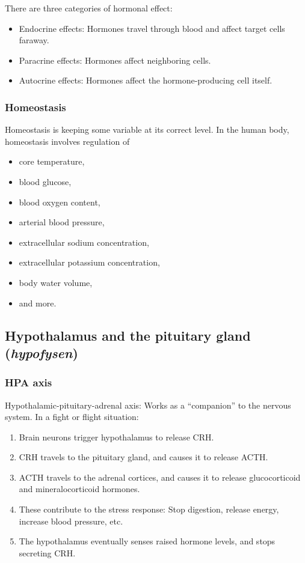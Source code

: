 There are three categories of hormonal effect:
\begin{itemize}
  \item Endocrine effects: Hormones travel through blood and affect target cells faraway.
  \item Paracrine effects: Hormones affect neighboring cells.
  \item Autocrine effects: Hormones affect the hormone-producing cell itself.
\end{itemize}

\subsubsection{Homeostasis}
Homeostasis is keeping some variable at its correct level. In the human body, homeostasis involves regulation of
\begin{itemize}
  \item core temperature,
  \item blood glucose,
  \item blood oxygen content,
  \item arterial blood pressure,
  \item extracellular sodium concentration,
  \item extracellular potassium concentration,
  \item body water volume,
  \item and more.
\end{itemize}

\subsection{Hypothalamus and the pituitary gland (\emph{hypofysen})}

\subsubsection{HPA axis}
Hypothalamic-pituitary-adrenal axis: Works as a ``companion'' to the nervous system. In a fight or flight situation:
\begin{enumerate}
  \item Brain neurons trigger hypothalamus to release CRH.
  \item CRH travels to the pituitary gland, and causes it to release ACTH.
  \item ACTH travels to the adrenal cortices, and causes it to release glucocorticoid and mineralocorticoid hormones.
  \item These contribute to the stress response: Stop digestion, release energy, increase blood pressure, etc.
  \item The hypothalamus eventually senses raised hormone levels, and stops secreting CRH.
\end{enumerate}

